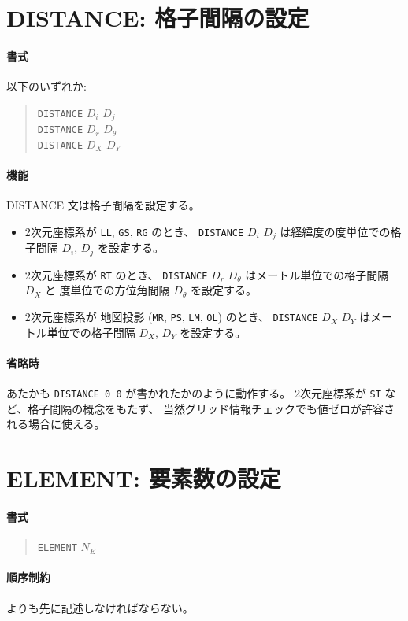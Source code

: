 \section{DISTANCE: 格子間隔の設定}
\label{sec:def:DISTANCE}
\paragraph{書式}
以下のいずれか:
\begin{quote}
{\tt DISTANCE} $D_i$ $D_j$ \\
{\tt DISTANCE} $D_r$ $D_\theta$ \\
{\tt DISTANCE} $D_X$ $D_Y$
\end{quote}
\paragraph{機能}
DISTANCE 文は格子間隔を設定する。
\begin{itemize}
\item
 2次元座標系が {\tt LL}, {\tt GS}, {\tt RG} のとき、
 {\tt DISTANCE} $D_i$ $D_j$ 
 は経緯度の度単位での格子間隔 $D_i$, $D_j$ を設定する。
\item
 2次元座標系が {\tt RT} のとき、
 {\tt DISTANCE} $D_r$ $D_\theta$ 
 はメートル単位での格子間隔 $D_X$ と
 度単位での方位角間隔 $D_\theta$ を設定する。
\item
 2次元座標系が
 地図投影 ({\tt MR}, {\tt PS}, {\tt LM}, {\tt OL}) のとき、
 {\tt DISTANCE} $D_X$ $D_Y$ 
 はメートル単位での格子間隔 $D_X$, $D_Y$ を設定する。
\end{itemize}
\paragraph{省略時}
あたかも {\tt DISTANCE 0 0} が書かれたかのように動作する。
2次元座標系が {\tt ST} など、格子間隔の概念をもたず、
当然グリッド情報チェックでも値ゼロが許容される場合に使える。

\section{ELEMENT: 要素数の設定}
\label{sec:def:ELEMENT}
\paragraph{書式}
\begin{quote}
{\tt ELEMENT} $N_E$ \end{quote}
\paragraph{順序制約}
 よりも先に記述しなければならない。
